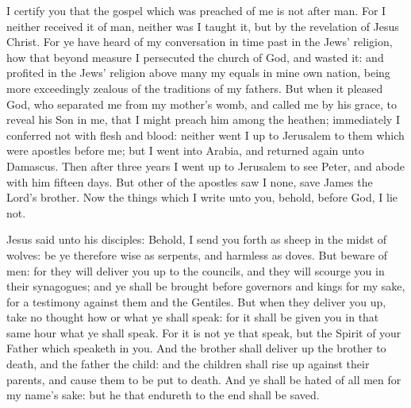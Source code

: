  I certify you that the gospel which was preached of me is not after man. For I neither received it of man, neither was I taught it, but by the revelation of Jesus Christ. For ye have heard of my conversation in time past in the Jews' religion, how that beyond measure I persecuted the church of God, and wasted it: and profited in the Jews' religion above many my equals in mine own nation, being more exceedingly zealous of the traditions of my fathers. But when it pleased God, who separated me from my mother’s womb, and called me by his grace, to reveal his Son in me, that I might preach him among the heathen; immediately I conferred not with flesh and blood: neither went I up to Jerusalem to them which were apostles before me; but I went into Arabia, and returned again unto Damascus. Then after three years I went up to Jerusalem to see Peter, and abode with him fifteen days. But other of the apostles saw I none, save James the Lord’s brother. Now the things which I write unto you, behold, before God, I lie not.


 Jesus said unto his disciples: Behold, I send you forth as sheep in the midst of wolves: be ye therefore wise as serpents, and harmless as doves. But beware of men: for they will deliver you up to the councils, and they will scourge you in their synagogues; and ye shall be brought before governors and kings for my sake, for a testimony against them and the Gentiles. But when they deliver you up, take no thought how or what ye shall speak: for it shall be given you in that same hour what ye shall speak. For it is not ye that speak, but the Spirit of your Father which speaketh in you. And the brother shall deliver up the brother to death, and the father the child: and the children shall rise up against their parents, and cause them to be put to death. And ye shall be hated of all men for my name's sake: but he that endureth to the end shall be saved. 


